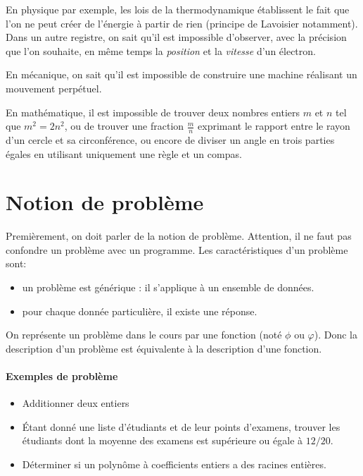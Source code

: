 En physique par exemple, les lois de la thermodynamique établissent le fait que l'on ne peut créer de l'énergie à partir de rien (principe de Lavoisier notamment). Dans un autre registre, on sait qu'il est impossible d'observer, avec la précision que l'on souhaite, en même temps la \textit{position} et la \textit{vitesse} d'un électron.

En mécanique, on sait qu'il est impossible de construire une machine réalisant un mouvement perpétuel.

En mathématique, il est impossible de trouver deux nombres entiers $m$ et $n$ tel que $m^2 = 2n^2$, ou de trouver une fraction $\frac{m}{n}$ exprimant le rapport entre le rayon d'un cercle et sa circonférence, ou encore de diviser un angle en trois parties égales en utilisant uniquement une règle et un compas.

\section{Notion de problème}
\label{sec:notion_de_probleme}

Premièrement, on doit parler de la notion de problème.
Attention, il ne faut pas confondre un problème avec un programme.
Les caractéristiques d'un problème sont:

\begin{itemize}
	\item un problème est générique : il s'applique à un ensemble de données.
	\item pour chaque donnée particulière, il existe une réponse.
\end{itemize}

On représente un problème dans le cours par une fonction (noté $\phi$ ou $\varphi$). 
Donc la description d'un problème est équivalente à la description d'une fonction.

\paragraph{Exemples de problème}
\begin{itemize}
	\item Additionner deux entiers
	\item Étant donné une liste d'étudiants et de leur points d'examens, trouver les étudiants dont la moyenne des examens est supérieure ou égale à $12/20$.
	\item Déterminer si un polynôme à coefficients entiers a des racines entières.
\end{itemize}

